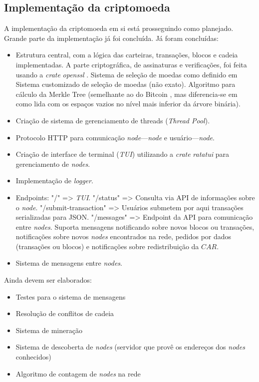 \documentclass[
  12pt,
  a4paper,
  oneside,
  article,
]{abntex2}
\begin{document}
\subsection{Implementação da criptomoeda}

A implementação da criptomoeda em si está prosseguindo como planejado. Grande parte da implementação já foi concluída. Já foram concluídas:

\begin{itemize}[leftmargin=1.5cm, itemsep=0pt, topsep=2pt]
	\item Estrutura central, com a lógica das carteiras, transações, blocos e cadeia implementadas. A parte criptográfica, de assinaturas e verificações, foi feita usando a \textit{crate} \textit{openssl} \cite{openssl}.
	      \subitem Sistema de seleção de moedas como definido em \textcite{murchbnb}
	      \subitem Sistema customizado de seleção de moedas (não exato).
	      \subitem Algoritmo para cálculo da Merkle Tree (semelhante ao do Bitcoin \cite{nakamoto2008}, mas diferencia-se em como lida com os espaços vazios no nível mais inferior da árvore binária).
	\item Criação de sistema de gerenciamento de threads (\textit{Thread Pool}).
	\item Protocolo HTTP para comunicação \textit{node}—\textit{node} e usuário—\textit{node}.
	\item Criação de interface de terminal (\textit{TUI}) utilizando a \textit{crate} \textit{ratatui}  \cite{ratatui} para gerenciamento de \textit{nodes}.
	\item Implementação de \textit{logger}.
	\item Endpoints:
	      \subitem "/" => \textit{TUI}.
	      \subitem "/status" => Consulta via API de informações sobre o \textit{node}.
	      \subitem "/submit-transaction" => Usuários submetem por aqui transações serializadas para JSON.
	      \subitem "/messages" => Endpoint da API para comunicação entre \textit{nodes}. Suporta mensagens notificando sobre novos blocos ou transações, notificações sobre novos \textit{nodes} encontrados na rede, pedidos por dados (transações ou blocos) e notificações sobre redistribuição da $CAR$.
	\item Sistema de mensagens entre \textit{nodes}.
\end{itemize}

Ainda devem ser elaborados:
\begin{itemize}[leftmargin=1.5cm, itemsep=0pt, topsep=2pt]
	\item Testes para o sistema de mensagens
	\item Resolução de conflitos de cadeia
	\item Sistema de mineração
	\item Sistema de descoberta de \textit{nodes} (servidor que provê os endereços dos \textit{nodes} conhecidos)
	\item Algoritmo de contagem de \textit{nodes} na rede
\end{itemize}
\end{document}
